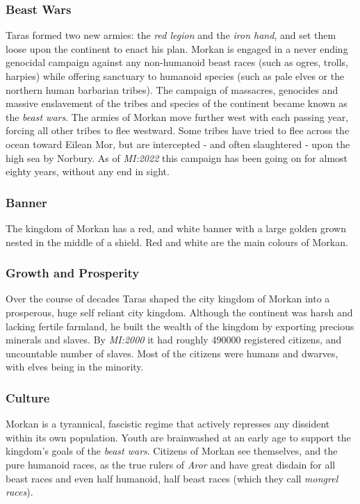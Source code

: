 \subsubsection{Beast Wars}
\label{sec:Beast Wars}

Taras formed two new armies: the \emph{red legion} and the
\emph{iron hand}, and set them loose upon the continent to enact his
plan. Morkan is engaged in a never ending genocidal campaign against any
non-humanoid beast races (such as ogres, trolls, harpies) while offering
sanctuary to humanoid species (such as pale elves or the northern human
barbarian tribes). The campaign of massacres, genocides and massive
enslavement of the tribes and species of the continent became known as the
\emph{beast wars}. The armies of Morkan move further west with each passing
year, forcing all other tribes to flee westward. Some tribes have tried to
flee across the ocean toward Eilean Mor, but are intercepted - and often
slaughtered - upon the high sea by Norbury. As of \emph{MI:2022} this campaign
has been going on for almost eighty years, without any end in sight.

\subsubsection{Banner}

The kingdom of Morkan has a red, and white banner with a large golden grown
nested in the middle of a shield. Red and white are the main colours of
Morkan.

\subsubsection{Growth and Prosperity}

Over the course of decades Taras shaped the city kingdom of Morkan into a
prosperous, huge self reliant city kingdom. Although the continent was harsh
and lacking fertile farmland, he built the wealth of the kingdom by exporting
precious minerals and slaves. By \emph{MI:2000} it had roughly 490000
registered citizens, and uncountable number of slaves. Most of the citizens
were humans and dwarves, with elves being in the minority.

\subsubsection{Culture}

Morkan is a tyrannical, fascistic regime that actively represses any dissident
within its own population. Youth are brainwashed at an early age to support
the kingdom's goals of the \emph{beast wars}. Citizens of Morkan see
themselves, and the pure humanoid races, as the true rulers of \emph{Aror} and
have great disdain for all beast races and even half humanoid, half beast races
(which they call \emph{mongrel races}).

